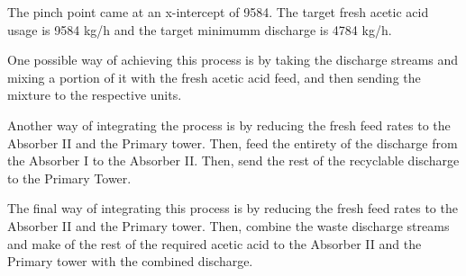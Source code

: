 The pinch point came at an x-intercept of 9584. The target fresh acetic acid usage is 9584 kg/h and the target minimumm discharge is 4784 kg/h.

One possible way of achieving this process is by taking the discharge streams and mixing a portion of it with the fresh acetic acid feed, and then sending the mixture to the respective units.

Another way of integrating the process is by reducing the fresh feed rates to the Absorber II and the Primary tower. Then, feed the entirety of the discharge from the Absorber I to the Absorber II. Then, send the rest of the recyclable discharge to the Primary Tower.

The final way of integrating this process is by reducing the fresh feed rates to the Absorber II and the Primary tower. Then, combine the waste discharge streams and make of the rest of the required acetic acid to the Absorber II and the Primary tower with the combined discharge.